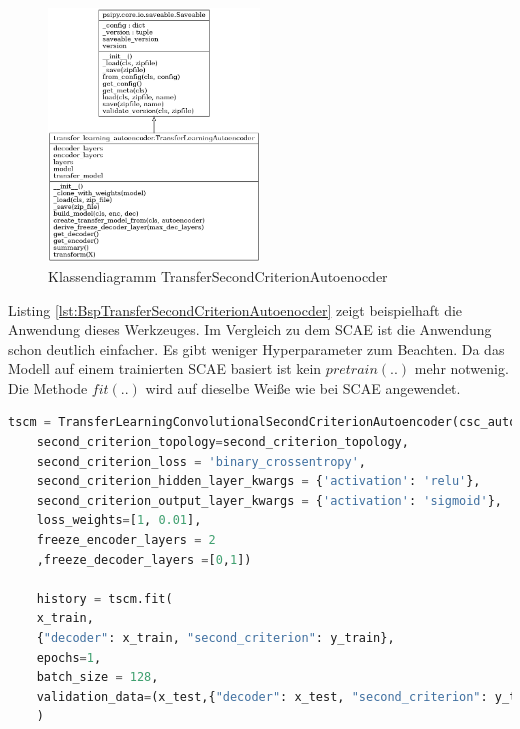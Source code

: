 	\begin{figure}[h]
		\centering
		\includegraphics[width=0.5\textwidth, center]{bilder/Klassendiagramme/Klassendiagramm_TLCSCAE.png}
		\caption[Klassendiagramm TransferSecondCriterionAutoenocder]{Klassendiagramm TransferSecondCriterionAutoenocder}
		\label{img:KlassendiagrammTransferSecondCriterionAutoenocder}
	\end{figure}  
	Listing \ref{lst:BspTransferSecondCriterionAutoenocder} zeigt beispielhaft die Anwendung dieses Werkzeuges. Im Vergleich zu dem SCAE ist die Anwendung schon deutlich einfacher. Es gibt weniger Hyperparameter zum Beachten. Da das Modell auf einem trainierten SCAE basiert ist kein $pretrain(..)$ mehr notwenig. Die Methode $fit(..)$ wird auf dieselbe Weiße wie bei SCAE angewendet.	


	\begin{lstlisting}[language=python,caption=Beispiel TransferSecondCriterionAutoenocder in Python, label=lst:BspTransferSecondCriterionAutoenocder]
	tscm = TransferLearningConvolutionalSecondCriterionAutoencoder(csc_autoencoder,
	second_criterion_topology=second_criterion_topology,
	second_criterion_loss = 'binary_crossentropy',                                                                                                   
	second_criterion_hidden_layer_kwargs = {'activation': 'relu'},
	second_criterion_output_layer_kwargs = {'activation': 'sigmoid'}, 
	loss_weights=[1, 0.01],
	freeze_encoder_layers = 2
	,freeze_decoder_layers =[0,1])
	
	history = tscm.fit(
	x_train,
	{"decoder": x_train, "second_criterion": y_train}, 
	epochs=1,
	batch_size = 128,
	validation_data=(x_test,{"decoder": x_test, "second_criterion": y_test}))
	)
	\end{lstlisting}
			
